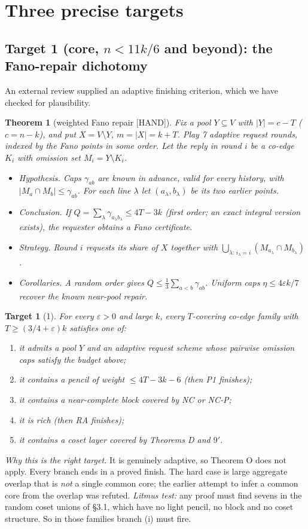 \documentclass[11pt]{article}
\newcommand{\st}[1]{\textsf{\small[#1]}}
\newtheorem*{thm}{Theorem}
\newtheorem*{tgt}{Target}
\begin{document}
\section{Three precise targets}

\subsection*{Target 1 (core, $n<11k/6$ and beyond): the Fano-repair dichotomy}
An external review supplied an adaptive finishing criterion, which we have checked for plausibility.
\begin{thm}[weighted Fano repair \st{HAND}]
Fix a pool $Y\subseteq V$ with $|Y|=c-T$ ($c=n-k$), and put $X=V\setminus Y$, $m=|X|=k+T$. Play 7 adaptive request
rounds, indexed by the Fano points in some order. Let the reply in round $i$ be a co-edge $K_i$ with omission set
$M_i=Y\setminus K_i$.
\begin{itemize}
\item \emph{Hypothesis.} Caps $\gamma_{ab}$ are known in advance, valid for every history, with
$|M_a\cap M_b|\le\gamma_{ab}$. For each line $\lambda$ let $(a_\lambda,b_\lambda)$ be its two earlier points.
\item \emph{Conclusion.} If $Q=\sum_\lambda\gamma_{a_\lambda b_\lambda}\le4T-3k$ (first order; an exact integral version
exists), the requester obtains a Fano certificate.
\item \emph{Strategy.} Round $i$ requests its share of $X$ together with $\bigcup_{\lambda:\,i_\lambda=i}(M_{a_\lambda}\cap
M_{b_\lambda})$.
\item \emph{Corollaries.} A random order gives $Q\le\frac13\sum_{a<b}\gamma_{ab}$. Uniform caps $\eta\le4\varepsilon k/7$
recover the known near-pool repair.
\end{itemize}
\end{thm}
\begin{tgt}[1]
For every $\varepsilon>0$ and large $k$, every $T$-covering co-edge family with $T\ge(3/4+\varepsilon)k$ satisfies one of:
\begin{enumerate}[label=(\roman*)]
\item it admits a pool $Y$ and an adaptive request scheme whose pairwise omission caps satisfy the budget above;
\item it contains a pencil of weight $\le4T-3k-6$ (then P1 finishes);
\item it contains a near-complete block covered by NC or NC-P;
\item it is rich (then RA finishes);
\item it contains a coset layer covered by Theorems D and $9'$.
\end{enumerate}
\end{tgt}
\noindent\emph{Why this is the right target.} It is genuinely adaptive, so Theorem O does not apply. Every branch ends in
a proved finish. The hard case is large aggregate overlap that is \emph{not} a single common core; the earlier attempt to
infer a common core from the overlap was refuted. \emph{Litmus test:} any proof must find sevens in the random coset
unions of \S3.1, which have no light pencil, no block and no coset structure. So in those families branch (i) must
fire.
\end{document}
